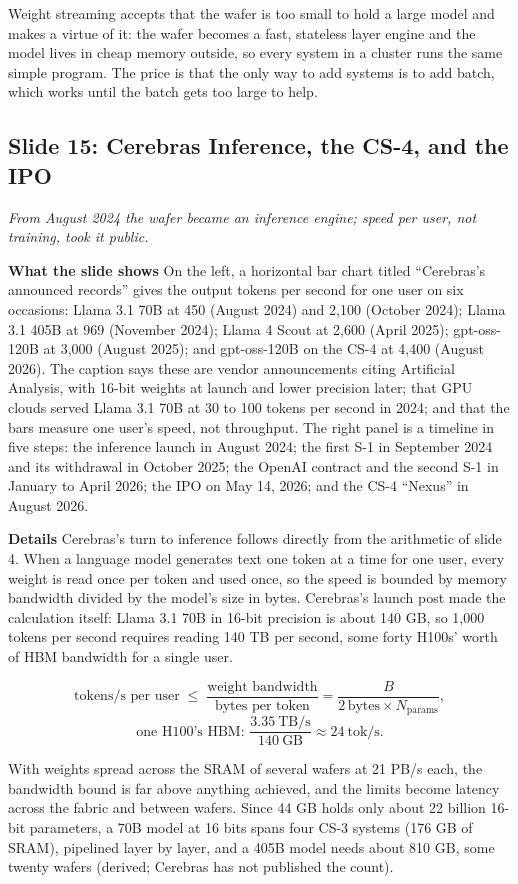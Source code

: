 \documentclass[11pt,letterpaper]{article}
\newcommand{\slide}[3]{%
  \subsection[Slide #1: #2]{Slide #1: #2}%
  {\color{muted}\itshape #3\par}\medskip}
\newcommand{\para}[1]{\medskip\noindent\textbf{#1}\quad}
\newenvironment{intuition}{\begin{tcolorbox}[intuitionbox]}{\end{tcolorbox}}
\newenvironment{formulas}{\begin{tcolorbox}[formulabox]}{\end{tcolorbox}}
\begin{document}
\begin{intuition}
Weight streaming accepts that the wafer is too small to hold a large model and makes a virtue of it: the wafer becomes a fast, stateless layer engine and the model lives in cheap memory outside, so every system in a cluster runs the same simple program. The price is that the only way to add systems is to add batch, which works until the batch gets too large to help.
\end{intuition}

\slide{15}{Cerebras Inference, the CS-4, and the IPO}{From August 2024 the wafer became an inference engine; speed per user, not training, took it public.}

\para{What the slide shows} On the left, a horizontal bar chart titled ``Cerebras's announced records'' gives the output tokens per second for one user on six occasions: Llama 3.1 70B at 450 (August 2024) and 2{,}100 (October 2024); Llama 3.1 405B at 969 (November 2024); Llama 4 Scout at 2{,}600 (April 2025); gpt-oss-120B at 3{,}000 (August 2025); and gpt-oss-120B on the CS-4 at 4{,}400 (August 2026). The caption says these are vendor announcements citing Artificial Analysis, with 16-bit weights at launch and lower precision later; that GPU clouds served Llama 3.1 70B at 30 to 100 tokens per second in 2024; and that the bars measure one user's speed, not throughput. The right panel is a timeline in five steps: the inference launch in August 2024; the first S-1 in September 2024 and its withdrawal in October 2025; the OpenAI contract and the second S-1 in January to April 2026; the IPO on May 14, 2026; and the CS-4 ``Nexus'' in August 2026.

\para{Details} Cerebras's turn to inference follows directly from the arithmetic of slide 4. When a language model generates text one token at a time for one user, every weight is read once per token and used once, so the speed is bounded by memory bandwidth divided by the model's size in bytes. Cerebras's launch post made the calculation itself: Llama 3.1 70B in 16-bit precision is about 140 GB, so 1{,}000 tokens per second requires reading 140 TB per second, some forty H100s' worth of HBM bandwidth for a single user.
\begin{formulas}
\[
\text{tokens/s per user} \;\le\; \frac{\text{weight bandwidth}}{\text{bytes per token}}
= \frac{B}{2\,\text{bytes} \times N_{\text{params}}},
\]
\[
\text{one H100's HBM: } \frac{3.35\ \text{TB/s}}{140\ \text{GB}} \approx 24\ \text{tok/s}.
\]
\end{formulas}
With weights spread across the SRAM of several wafers at 21 PB/s each, the bandwidth bound is far above anything achieved, and the limits become latency across the fabric and between wafers. Since 44 GB holds only about 22 billion 16-bit parameters, a 70B model at 16 bits spans four CS-3 systems (176 GB of SRAM), pipelined layer by layer, and a 405B model needs about 810 GB, some twenty wafers (derived; Cerebras has not published the count).
\end{document}
